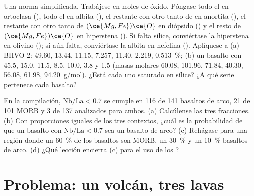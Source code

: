\begin{exercise}[$\star\star\star$]\label{exo:b2:magmatic-series:11}
Una norma simplificada. Trabájese en moles de óxido. Póngase todo el  en ortoclasa
(), todo el  en albita (), el
 restante con otro tanto de  en anortita (), el
 restante con otro tanto de $(\ce{Mg,Fe})\ce{O}$ en diópsido
() y el resto de $(\ce{Mg,Fe})\ce{O}$ en hiperstena
(). Si falta sílice, conviértase la hiperstena en olivino
(); si aún falta, conviértase la albita en nefelina
(). Aplíquese a (a) BHVO-2:  49.60,  13.44,
 11.15,  7.257,  11.40,  2.219, 
\qty{0.513}{\percent}; (b) un basalto con 45.5, 15.0, 11.5, 8.5, 10.0, 3.8 y 1.5 (masas
molares  60.08,  101.96,  71.84,  40.30, 
56.08,  61.98,  \qty{94.20}{g/mol}). ¿Está cada uno saturado en sílice? ¿A
qué serie pertenece cada basalto?
\end{exercise}

\begin{exercise}[$\star\star\star$]\label{exo:b2:magmatic-series:12}
En la compilación, $\mathrm{Nb}/\mathrm{La} < 0.7$ se cumple en 116 de 141 basaltos de arco,
21 de 101 MORB y 3 de 137  analizados para ambos. (a) Calcúlense las
tres fracciones. (b) Con proporciones iguales de los tres contextos, ¿cuál es la
probabilidad de que un basalto con $\mathrm{Nb}/\mathrm{La} < 0.7$ sea un basalto de arco? (c)
Rehágase para una región donde un \qty{60}{\percent} de los basaltos son MORB, un \qty{30}{\percent}
 y un \qty{10}{\percent} basaltos de arco. (d) ¿Qué lección encierra (c)
para el uso de los ?
\end{exercise}

\section{Problema: un volcán, tres lavas}

